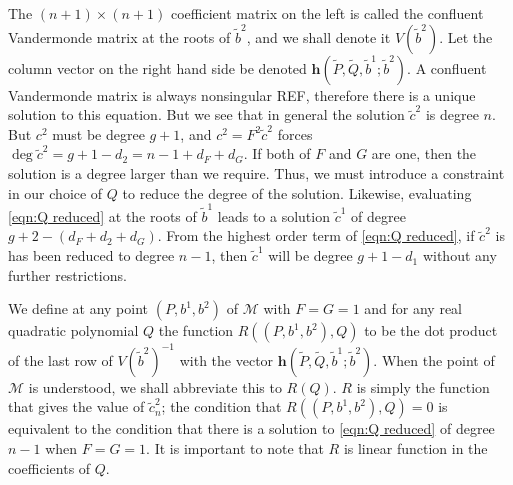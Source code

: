 The $(n+1)\times (n+1)$ coefficient matrix on the left is called the confluent Vandermonde matrix at the roots of $\tilde{b}^2$, and we shall denote it $V(\tilde{b}^2)$. Let the column vector on the right hand side be denoted $\mathbf{h}(\tilde{P},\tilde{Q},\tilde{b}^1;\tilde{b}^2)$. A confluent Vandermonde matrix is always nonsingular REF, therefore there is a unique solution to this equation. But we see that in general the solution $\tilde{c}^2$ is degree $n$. But $c^2$ must be degree $g+1$, and $c^2 = F^2\tilde{c}^2 $ forces $\deg \tilde{c}^2 = g+1 - d_2 = n-1 + d_F + d_G$.
If both of $F$ and $G$ are one, then the solution is a degree larger than we require. Thus, we must introduce a constraint in our choice of $Q$ to reduce the degree of the solution. Likewise, evaluating \eqref{eqn:Q reduced} at the roots of $\tilde{b}^1$ leads to a solution $\tilde{c}^1$ of degree $g+2 - (d_F + d_2 + d_G)$. From the highest order term of \eqref{eqn:Q reduced}, if $\tilde{c}^2$ is has been reduced to degree $n-1$, then $\tilde{c}^1$ will be degree $g + 1 - d_1$ without any further restrictions.

We define at any point $(P,b^1,b^2)$ of $\mathcal{M}$ with $F=G=1$ and for any real quadratic polynomial $Q$ the function $R((P,b^1,b^2),Q)$ to be the dot product of the last row of $V(\tilde{b}^2)^{-1}$ with the vector $\mathbf{h}(\tilde{P},\tilde{Q},\tilde{b}^1;\tilde{b}^2)$. When the point of $\mathcal{M}$ is understood, we shall abbreviate this to $R(Q)$. $R$ is simply the function that gives the value of $\tilde{c}^2_n$; the condition that $R((P,b^1,b^2),Q) = 0$ is equivalent to the condition that there is a solution to \eqref{eqn:Q reduced} of degree $n-1$ when $F=G=1$. It is important to note that $R$ is linear function in the coefficients of $Q$.

